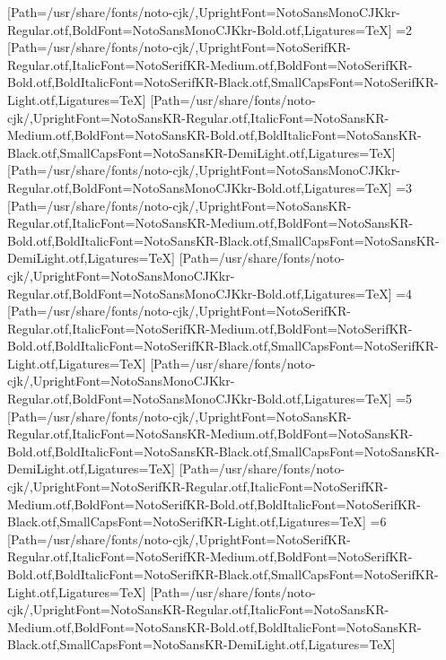 [Path=/usr/share/fonts/noto-cjk/,UprightFont=NotoSansMonoCJKkr-Regular.otf,BoldFont=NotoSansMonoCJKkr-Bold.otf,Ligatures=TeX]
\else\ifnum\value{CJKFonts}=2
[Path=/usr/share/fonts/noto-cjk/,UprightFont=NotoSerifKR-Regular.otf,ItalicFont=NotoSerifKR-Medium.otf,BoldFont=NotoSerifKR-Bold.otf,BoldItalicFont=NotoSerifKR-Black.otf,SmallCapsFont=NotoSerifKR-Light.otf,Ligatures=TeX]
[Path=/usr/share/fonts/noto-cjk/,UprightFont=NotoSansKR-Regular.otf,ItalicFont=NotoSansKR-Medium.otf,BoldFont=NotoSansKR-Bold.otf,BoldItalicFont=NotoSansKR-Black.otf,SmallCapsFont=NotoSansKR-DemiLight.otf,Ligatures=TeX]
[Path=/usr/share/fonts/noto-cjk/,UprightFont=NotoSansMonoCJKkr-Regular.otf,BoldFont=NotoSansMonoCJKkr-Bold.otf,Ligatures=TeX]
\else\ifnum\value{CJKFonts}=3
[Path=/usr/share/fonts/noto-cjk/,UprightFont=NotoSansKR-Regular.otf,ItalicFont=NotoSansKR-Medium.otf,BoldFont=NotoSansKR-Bold.otf,BoldItalicFont=NotoSansKR-Black.otf,SmallCapsFont=NotoSansKR-DemiLight.otf,Ligatures=TeX]
[Path=/usr/share/fonts/noto-cjk/,UprightFont=NotoSansMonoCJKkr-Regular.otf,BoldFont=NotoSansMonoCJKkr-Bold.otf,Ligatures=TeX]
\else\ifnum\value{CJKFonts}=4
[Path=/usr/share/fonts/noto-cjk/,UprightFont=NotoSerifKR-Regular.otf,ItalicFont=NotoSerifKR-Medium.otf,BoldFont=NotoSerifKR-Bold.otf,BoldItalicFont=NotoSerifKR-Black.otf,SmallCapsFont=NotoSerifKR-Light.otf,Ligatures=TeX]
[Path=/usr/share/fonts/noto-cjk/,UprightFont=NotoSansMonoCJKkr-Regular.otf,BoldFont=NotoSansMonoCJKkr-Bold.otf,Ligatures=TeX]
\else\ifnum\value{CJKFonts}=5
[Path=/usr/share/fonts/noto-cjk/,UprightFont=NotoSansKR-Regular.otf,ItalicFont=NotoSansKR-Medium.otf,BoldFont=NotoSansKR-Bold.otf,BoldItalicFont=NotoSansKR-Black.otf,SmallCapsFont=NotoSansKR-DemiLight.otf,Ligatures=TeX]
[Path=/usr/share/fonts/noto-cjk/,UprightFont=NotoSerifKR-Regular.otf,ItalicFont=NotoSerifKR-Medium.otf,BoldFont=NotoSerifKR-Bold.otf,BoldItalicFont=NotoSerifKR-Black.otf,SmallCapsFont=NotoSerifKR-Light.otf,Ligatures=TeX]
\else\ifnum\value{CJKFonts}=6
[Path=/usr/share/fonts/noto-cjk/,UprightFont=NotoSerifKR-Regular.otf,ItalicFont=NotoSerifKR-Medium.otf,BoldFont=NotoSerifKR-Bold.otf,BoldItalicFont=NotoSerifKR-Black.otf,SmallCapsFont=NotoSerifKR-Light.otf,Ligatures=TeX]
[Path=/usr/share/fonts/noto-cjk/,UprightFont=NotoSansKR-Regular.otf,ItalicFont=NotoSansKR-Medium.otf,BoldFont=NotoSansKR-Bold.otf,BoldItalicFont=NotoSansKR-Black.otf,SmallCapsFont=NotoSansKR-DemiLight.otf,Ligatures=TeX]
